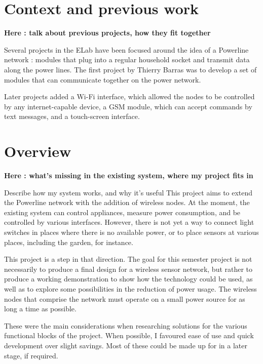 \section{Context and previous work}
\textbf{Here : talk about previous projects, how they fit together}


Several projects in the ELab have been focused around the idea of a Powerline
network : modules that plug into a regular household socket and transmit data
along the power lines. The first project by Thierry Barras \cite{barras2009} was
to develop a set of modules that can communicate together on the power network.

Later projects added a Wi-Fi interface, which allowed the nodes to be controlled
by any internet-capable device, a GSM module, which can accept commands by text
messages, and a touch-screen interface.


\section{Overview}
\textbf{Here : what's missing in the existing system, where my project fits in}

Describe how my system works, and why it's useful
This project aims to extend the Powerline network with the addition of wireless
nodes. At the moment, the existing system can control appliances, measure power
consumption, and be controlled by various interfaces. However, there is not yet
a way to connect light switches in places where there is no available power, or
to place sensors at various places, including the garden, for instance.

This project is a step in that direction. The goal for this semester project is
not necessarily to produce a final design for a wireless sensor network, but
rather to produce a working demonstration to show how the technology could be
used, as well as to explore some possibilities in the reduction of power usage.
The wireless nodes that comprise the network must operate on a small power
source for as long a time as possible.

These were the main considerations when researching solutions for the various
functional blocks of the project. When possible, I favoured ease of use and
quick development over slight savings. Most of these could be made up for in a
later stage, if required.


